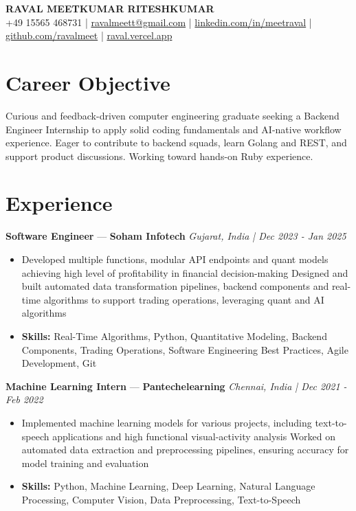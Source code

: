 \documentclass[a4paper,10pt]{article}
\begin{document}
\begin{center}
  {\Large\bfseries RAVAL MEETKUMAR RITESHKUMAR}\\[2pt]
  {\small +49 15565 468731 \;|\; \href{mailto:ravalmeett@gmail.com}{ravalmeett@gmail.com} \;|\; \href{https://www.linkedin.com/in/meetraval/}{linkedin.com/in/meetraval} \;|\; \href{https://github.com/ravalmeet}{github.com/ravalmeet} \;|\; \href{https://raval.vercel.app/}{raval.vercel.app}}
\end{center}
\vspace{-3pt}

\section*{Career Objective}
Curious and feedback-driven computer engineering graduate seeking a Backend Engineer Internship to apply solid coding fundamentals and AI-native workflow experience. Eager to contribute to backend squads, learn Golang and REST, and support product discussions. Working toward hands-on Ruby experience.\par

\section*{Experience}
\textbf{Software Engineer} — \textbf{Soham Infotech} \hfill \textit{Gujarat, India \;|\; Dec 2023 - Jan 2025}\par
\vspace{1pt}
\begin{itemize}
  \item Developed multiple functions, modular API endpoints and quant models achieving high level of profitability in financial decision-making Designed and built automated data transformation pipelines, backend components and real-time algorithms to support trading operations, leveraging quant and AI algorithms
  \item \textbf{Skills:} Real-Time Algorithms, Python, Quantitative Modeling, Backend Components, Trading Operations, Software Engineering Best Practices, Agile Development, Git
\end{itemize}
\vspace{3pt}
\textbf{Machine Learning Intern} — \textbf{Pantechelearning} \hfill \textit{Chennai, India \;|\; Dec 2021 - Feb 2022}\par
\vspace{1pt}
\begin{itemize}
  \item Implemented machine learning models for various projects, including text-to-speech applications and high functional visual-activity analysis Worked on automated data extraction and preprocessing pipelines, ensuring accuracy for model training and evaluation
  \item \textbf{Skills:} Python, Machine Learning, Deep Learning, Natural Language Processing, Computer Vision, Data Preprocessing, Text-to-Speech
\end{itemize}
\end{document}
